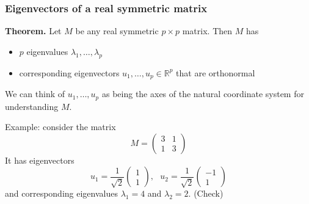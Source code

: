 \documentclass[smaller]{beamer}
\def\R{{\mathbb R}}
\def\darkgreen{\color{green!60!black}}
\def\v2{{\vskip.2in}}
\def\R{{\mathbb R}}
\begin{document}
\begin{frame}
\frametitle{Eigenvectors of a real symmetric matrix}

{\bf Theorem.} Let $M$ be any real symmetric $p \times p$ matrix. Then $M$ has
\begin{itemize}
\item $p$ eigenvalues $\lambda_1, \ldots, \lambda_p$
\item corresponding eigenvectors $u_1, \ldots, u_p \in \R^p$ that are orthonormal
\end{itemize}

\pause\v2
\alert{We can think of $u_1, \ldots, u_p$ as being the axes of the natural coordinate 
system for understanding $M$.}

\pause\v2
{\darkgreen Example: consider the matrix
$$ M = \begin{pmatrix} 3 & 1 \\ 1 & 3 \end{pmatrix} $$
It has eigenvectors
$$ u_1 = \frac{1}{\sqrt{2}} \begin{pmatrix} 1 \\ 1 \end{pmatrix}, \ \ \ 
u_2 = \frac{1}{\sqrt{2}} \begin{pmatrix} -1 \\ 1 \end{pmatrix} $$
and corresponding eigenvalues $\lambda_1 = 4$ and $\lambda_2 = 2$. (Check)}
\end{frame}
\end{document}
